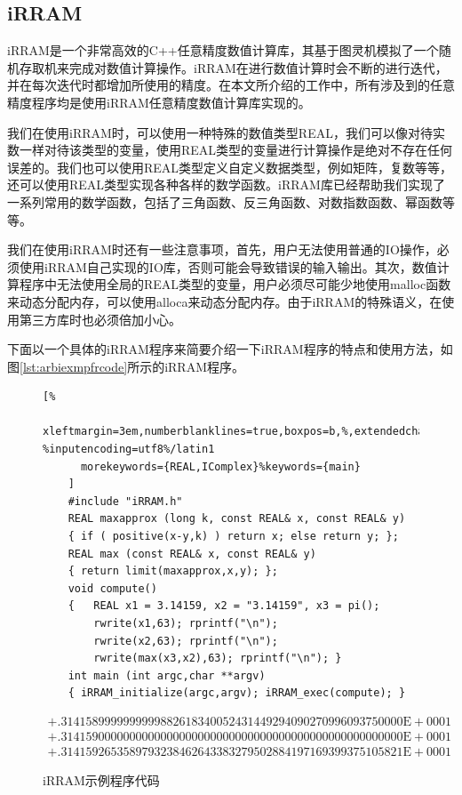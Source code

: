 \subsection{iRRAM}

iRRAM是一个非常高效的C++任意精度数值计算库，其基于图灵机模拟了一个随机存取机来完成对数值计算操作。iRRAM在进行数值计算时会不断的进行迭代，并在每次迭代时都增加所使用的精度。在本文所介绍的工作中，所有涉及到的任意精度程序均是使用iRRAM任意精度数值计算库实现的。

我们在使用iRRAM时，可以使用一种特殊的数值类型REAL，我们可以像对待实数一样对待该类型的变量，使用REAL类型的变量进行计算操作是绝对不存在任何误差的。我们也可以使用REAL类型定义自定义数据类型，例如矩阵，复数等等，还可以使用REAL类型实现各种各样的数学函数。iRRAM库已经帮助我们实现了一系列常用的数学函数，包括了三角函数、反三角函数、对数指数函数、幂函数等等。

我们在使用iRRAM时还有一些注意事项，首先，用户无法使用普通的IO操作，必须使用iRRAM自己实现的IO库，否则可能会导致错误的输入输出。其次，数值计算程序中无法使用全局的REAL类型的变量，用户必须尽可能少地使用malloc函数来动态分配内存，可以使用alloca来动态分配内存。由于iRRAM的特殊语义，在使用第三方库时也必须倍加小心。

下面以一个具体的iRRAM程序来简要介绍一下iRRAM程序的特点和使用方法，如图\ref{lst:arbiexmpfrcode}所示的iRRAM程序。

\begin{figure}[thbp]
    \begin{lstlisting}[%
      xleftmargin=3em,numberblanklines=true,boxpos=b,%,extendedchars=\true, %inputencoding=utf8%/latin1
      morekeywords={REAL,IComplex}%keywords={main}
    ]
    #include "iRRAM.h"
    REAL maxapprox (long k, const REAL& x, const REAL& y)
    { if ( positive(x-y,k) ) return x; else return y; };
    REAL max (const REAL& x, const REAL& y)
    { return limit(maxapprox,x,y); };
    void compute()
    {   REAL x1 = 3.14159, x2 = "3.14159", x3 = pi();
        rwrite(x1,63); rprintf("\n"); 
        rwrite(x2,63); rprintf("\n"); 
        rwrite(max(x3,x2),63); rprintf("\n"); }
    int main (int argc,char **argv)
    { iRRAM_initialize(argc,argv); iRRAM_exec(compute); }
    \end{lstlisting}
    \begin{align*}
        +.3141589999999999882618340052431449294090270996093750000\text{E}+0001 \\
        +.3141590000000000000000000000000000000000000000000000000\text{E}+0001 \\
        +.3141592653589793238462643383279502884197169399375105821\text{E}+0001
    \end{align*}

    \caption{iRRAM示例程序代码}
    \label{lst:irramexcode}
\end{figure}


